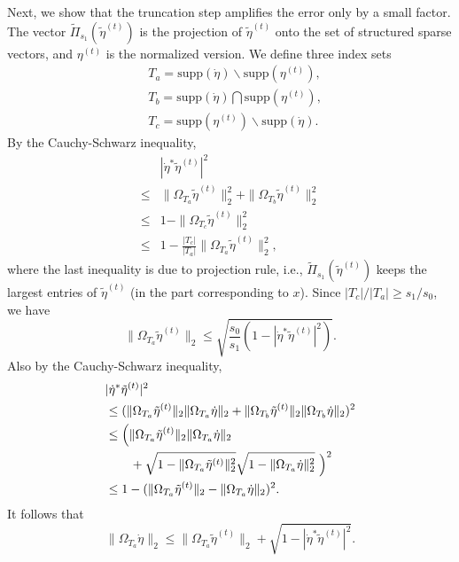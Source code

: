 \documentclass[11pt,journal]{IEEEtran}
\newcommand{\norm}[1]{\|{#1}\|}
\newcommand{\supp}{\mathrm{supp}}
\begin{document}
\begin{IEEEproof}
Next, we show that the truncation step amplifies the error only by a small factor. The vector $\widetilde{\Pi}_{s_1}(\tilde{\eta}^{(t)})$ is the projection of $\tilde{\eta}^{(t)}$ onto the set of structured sparse vectors, and $\eta^{(t)}$ is the normalized version. We define three index sets
\begin{align*}
& T_a = \supp(\dot{\eta})\backslash \supp(\eta^{(t)}), \\
& T_b = \supp(\dot{\eta})\bigcap \supp(\eta^{(t)}), \\
& T_c = \supp(\eta^{(t)})\backslash \supp(\dot{\eta}). 
\end{align*} 
By the Cauchy-Schwarz inequality,
\begin{align*}
& |\dot{\eta}^*\tilde{\eta}^{(t)}|^2 \\
\leq & \norm{\Omega_{T_a} \tilde{\eta}^{(t)}}_2^2 + \norm{\Omega_{T_b} \tilde{\eta}^{(t)}}_2^2 \\
\leq & 1 - \norm{\Omega_{T_c} \tilde{\eta}^{(t)}}_2^2 \\
\leq & 1 - \frac{|T_c|}{|T_a|} \norm{\Omega_{T_a} \tilde{\eta}^{(t)}}_2^2,
\end{align*}
where the last inequality is due to projection rule, i.e., $\widetilde{\Pi}_{s_1}(\tilde{\eta}^{(t)})$ keeps the largest entries of $\tilde{\eta}^{(t)}$ (in the part corresponding to $x$). Since ${|T_c|}/{|T_a|}\geq s_1/s_0$, we have
\begin{equation}
\label{eq:Tat}
\norm{\Omega_{T_a} \tilde{\eta}^{(t)}}_2 \leq \sqrt{\frac{s_0}{s_1} (1-|\dot{\eta}^*\tilde{\eta}^{(t)}|^2)}.
\end{equation}
Also by the Cauchy-Schwarz inequality,
\begin{align*}
& |\dot{\eta}^*\tilde{\eta}^{(t)}|^2 \\
& \leq (\norm{\Omega_{T_a} \tilde{\eta}^{(t)}}_2 \norm{\Omega_{T_a} \dot{\eta}}_2 + \norm{\Omega_{T_b} \tilde{\eta}^{(t)}}_2 \norm{\Omega_{T_b} \dot{\eta}}_2)^2 \\
& \leq \Bigl(\norm{\Omega_{T_a} \tilde{\eta}^{(t)}}_2 \norm{\Omega_{T_a} \dot{\eta}}_2 \\
& \qquad + \sqrt{1-\norm{\Omega_{T_a} \tilde{\eta}^{(t)}}_2^2} \sqrt{1-\norm{\Omega_{T_a} \dot{\eta}}_2^2} ~\Bigr)^2 \\
& \leq 1 - (\norm{\Omega_{T_a} \tilde{\eta}^{(t)}}_2 - \norm{\Omega_{T_a} \dot{\eta}}_2)^2.
\end{align*}
It follows that
\begin{equation}
\label{eq:Tad}
\norm{\Omega_{T_a} \dot{\eta}}_2 \leq \norm{\Omega_{T_a} \tilde{\eta}^{(t)}}_2 + \sqrt{1-|\dot{\eta}^*\tilde{\eta}^{(t)}|^2}.

\end{equation}
\end{IEEEproof}
\end{document}
